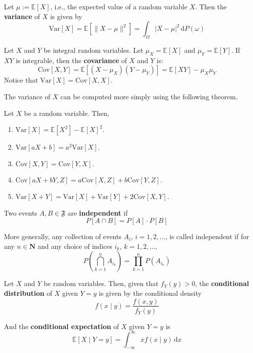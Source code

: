 \begin{definition}[Variance]
	Let $\mu := \mathbb{E}[X]$, i.e., the expected value of a random variable $X$. Then the \textbf{variance} of $X$ is given by
	\[
		\text{Var}[X] = \mathbb{E}[\|X - \mu\|^2] = \int_{\Omega} |X - \mu|^2 \, \mathrm{d} P(\omega)
	\]
\end{definition}

\begin{definition}[Covariance]
	Let $X$ and $Y$ be integral random variables. Let $\mu_X = \mathbb{E}[X]$ and $\mu_Y = \mathbb{E}[Y]$. If $XY$ is integrable, then the \textbf{covariance} of $X$ and $Y$ is:
	\[
		\text{Cov}[X,Y] = \mathbb{E}[(X-\mu_X)(Y-\mu_Y)] = \mathbb{E}[XY]-\mu_X \mu_Y
	\]
	Notice that $\text{Var}[X] = \text{Cov}[X,X]$.
\end{definition}

The variance of $X$ can be computed more simply using the following theorem.

\begin{theorem}
	Let $X$ be a random variable. Then,
	\begin{enumerate}
		\item $\text{Var}[X] = \mathbb{E}[X^2] - \mathbb{E}[X]^2$.
		\item $\text{Var}[aX+b] = a^2 \text{Var}[X]$.
		\item $\text{Cov}[X,Y] = \text{Cov}[Y,X]$.
		\item $\text{Cov}[aX+bY,Z] = a \text{Cov}[X,Z] + b \text{Cov}[Y,Z]$.
		\item $\text{Var}[X+Y] = \text{Var}[X] + \text{Var}[Y] + 2 \text{Cov}[X,Y]$.
	\end{enumerate}		
\end{theorem}

\begin{definition}[Independence]
	Two events $A, B \in \mathfrak{F}$ are \textbf{independent} if
	\[
		P[A \cap B] = P[A]\cdot P[B]
	\]
	
	More generally, any collection of events $A_i$, $i = 1,2,\ldots$, is called independent if for any $n \in \textbf{N}$ and any choice of indices $i_k$, $k = 1, 2, \ldots$, 
	\[
		P \left( \bigcap_{k=1}^n A_{i_k} \right) = \prod_{k=1}^n P\left( A_{i_k} \right)
	\]
\end{definition}

\begin{definition}
	Let $X$ and $Y$ be random variables. Then, given that $f_Y(y) > 0$, the \textbf{conditional distribution} of $X$ given $Y=y$ is given by the conditional density
	\[
		f(x \mid y) = \frac{f(x,y)}{f_Y(y)}
	\]
	
	And the \textbf{conditional expectation} of $X$ given $Y=y$ is
	\[
		\mathbb{E} [X \mid  Y = y] = \int_{-\infty}^\infty x f(x \mid y) \, \mathrm{d}x
	\]
\end{definition}

